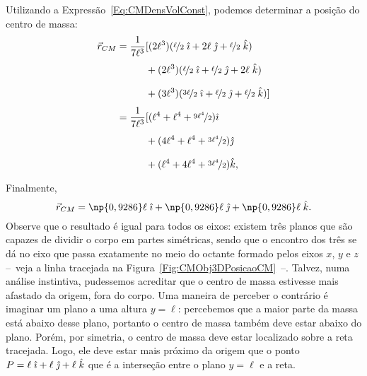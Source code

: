Utilizando a Expressão~\eqref{Eq:CMDensVolConst}, podemos determinar a posição do centro de massa:
\begin{align}
    \vec{r}_{CM} &= \frac{1}{7\ell^3} [(2\ell^3)(\nicefrac{\ell}{2}\;\versi + 2\ell\;\versj + \nicefrac{\ell}{2}\;\versk) \\
    &\phantom{=\frac{1}{7\ell^3} [} + (2\ell^3)(\nicefrac{\ell}{2}\;\versi + \nicefrac{\ell}{2}\;\versj + 2\ell\;\versk) \\
    &\phantom{=\frac{1}{7\ell^3} [} + (3\ell^3)(\nicefrac{3\ell}{2}\;\versi + \nicefrac{\ell}{2}\;\versj + \nicefrac{\ell}{2}\;\versk)] \\
    &= \frac{1}{7\ell^3} [(\ell^4 + \ell^4 + \nicefrac{9\ell^4}{2})\versi \\
    &\phantom{=\frac{1}{7\ell^3} [}+ (4\ell^4 + \ell^4 + \nicefrac{3\ell^4}{2})\versj \\
    &\phantom{=\frac{1}{7\ell^3} [}+ (\ell^4 + 4\ell^4 + \nicefrac{3\ell^4}{2})\versk,
\end{align}
%
Finalmente,
\begin{equation}
	\vec{r}_{CM} = \np{0,9286} \ell\; \versi + \np{0,9286} \ell \; \versj + \np{0,9286} \ell \; \versk.
\end{equation}
%
Observe que o resultado é igual para todos os eixos: existem três planos que são capazes de dividir o corpo em partes simétricas, sendo que o encontro dos três se dá no eixo que passa exatamente no meio do octante formado pelos eixos $x$, $y$ e $z$ --~veja a linha tracejada na Figura~\ref{Fig:CMObj3DPosicaoCM}~--. Talvez, numa análise instintiva, pudessemos acreditar que o centro de massa estivesse mais afastado da origem, fora do corpo. Uma maneira de perceber o contrário é imaginar um plano a uma altura $y = \ell$: percebemos que a maior parte da massa está abaixo desse plano, portanto o centro de massa também deve estar abaixo do plano. Porém, por simetria, o centro de massa deve estar localizado sobre a reta tracejada. Logo, ele deve estar mais próximo da origem que o ponto $P = \ell \; \hat{\imath} + \ell \; \hat{\jmath} + \ell \; \hat{k}$ que é a interseção entre o plano $y = \ell$ e a reta. 

